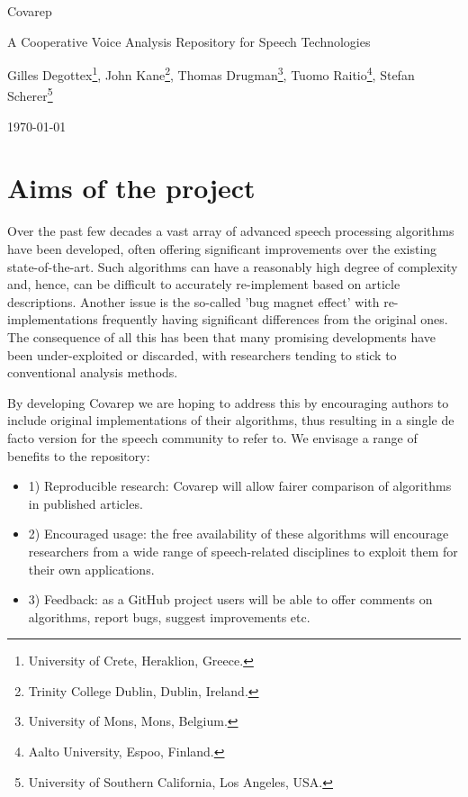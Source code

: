 \documentclass{article}
\date{\today}
\begin{document}
\vspace{1cm}
\centerline{\huge{Covarep}}
\vspace{1em}
\centerline{\large{A Cooperative Voice Analysis Repository for Speech Technologies}}
\vspace{1em}
\centerline{Gilles Degottex\footnote{University of Crete, Heraklion, Greece.}, John Kane\footnote{Trinity College Dublin, Dublin, Ireland.}, Thomas Drugman\footnote{University of Mons, Mons, Belgium.}, Tuomo Raitio\footnote{Aalto University, Espoo, Finland.}, Stefan Scherer\footnote{University of Southern California, Los Angeles, USA.}}
\vspace{1em}
\centerline{\today}

\vspace{16em}




\section{Aims of the project}
    Over the past few decades a vast array of advanced speech processing algorithms have been developed, often offering significant improvements over the existing state-of-the-art. Such algorithms can have a reasonably high degree of complexity and, hence, can be difficult to accurately re-implement based on article descriptions. Another issue is the so-called 'bug magnet effect' with re-implementations frequently having significant differences from the original ones. The consequence of all this has been that many promising developments have been under-exploited or discarded, with researchers tending to stick to conventional analysis methods.

    By developing Covarep we are hoping to address this by encouraging authors to include original implementations of their algorithms, thus resulting in a single de facto version for the speech community to refer to.
    We envisage a range of benefits to the repository:
    \begin{itemize}
    \item[] 1) Reproducible research: Covarep will allow fairer comparison of algorithms in published articles.
    \item[] 2) Encouraged usage: the free availability of these algorithms will encourage researchers from a wide range of speech-related disciplines to exploit them for their own applications.
    \item[] 3) Feedback: as a GitHub project users will be able to offer comments on algorithms, report bugs, suggest improvements etc.
    \end{itemize}
\end{document}
